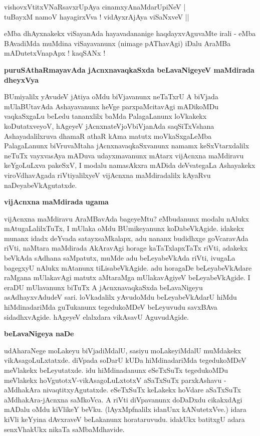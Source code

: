 \begin{shloka}
vishovxVtitxVNaRsavxrUpAya cinamxyAnaMdarUpiNeV |\\\label{65}
tuBayxM namoV hayagirxVva ! vidAyxrAjAya viSaNxveV ||
\end{shloka}

\noindent
eMba dhAyxnakekx viSayanAda hayavadananige haqdayxvAguvaMte irali - eMba BAvadiMda muMdina viSayavanunx (nimage pAThavAgi) iDalu AraMBa mADutetxVnapApx ! kaqSANx !

{\bigskip
\noindent
{\large\bf puruSAthaRmayavAda jAcnxnavaqkaSxda beLavaNigeyeV maMdirada dheyxVya}}\label{page65}
\medskip

\noindent
BUmiyalilx yAvudeV jAtiya oMdu biVjavanunx neTaTxrU A biVjada mUlaBUtavAda Ashayavanunx heVge parxpaMcitavAgi mADikoMDu vaqkaSxgaLu beLedu tananxlilx baMda PalagaLanunx loVkakekx koDutatxveyoV, hAgeyeV jAcnxnateVjoVbiVjanAda saqSiTxVshana Ashayadalilxruva dhamaR athaR kAma matutx moVkaSxgaLeMba PalagaLanunx biVruvaMtaha jAcnxnavaqkaSxvanunx namamx keSxVtarxdalilx neTuTx vayxvasAya mADuva udayxmavanunx mAtarx vijAcnxna maMdiravu keYgoLuLxva pakeSxV, I modalu namasAkxra \hbox{mADida} deVvategaLa Ashayakekx viroVdhavAgada riVtiyalilxyeV vijAcnxna maMdiradalilx \hbox{kAyaRvu} naDeyabeVkAgutatxde.

{\bigskip
\noindent
{\large\bf vijAcnxna maMdirada ugama}}
\medskip

\noindent
vijAcnxna maMdiravu AraMBavAda bageyeMtu? eMbudanunx modalu nAlukx mAtugaLalilxTuTx, I mUlaka oMdu BUmikeyanunx koDabeVkAgide. idakekx munanx idadx deYvada satayxsaMkalapx, adu nananx budidhxge goVcaravAda riVti, naMtara maMdirada AkAravAgi horage kaTaTxlapxTaTx riVti, adakekx beVkAda sAdhana saMpatutx, muMde adu beLeyabeVkAda riVti, ivugaLa bagegxyU nAlukx mAtanunx tiLisabeVkAgide. adu horagaDe beLeyabeVkAdare raMgana mUlakavAgi matutx aMtaraMga mUlakavAgiyeV beLeyabeVkAgide. I eraDU mUlavanunx biTuTx A jAcnxnavaqkaSxda beLavaNigeyu asAdhayxvAdudeV sari. loVkadalilx yAvudoMdu beLeyabeVkAdarU hiMdu hiMdinadariMda guTukanunx tegedukoMDeV beLeyuvudu savxBAva sidadhxvAgide. hAgeyeV elalxdara vikAsavU AguvudAgide.

{\bigskip
\noindent
{\large\bf beLavaNigeya naDe}}\label{page66}
\medskip

\noindent
udAharaNege moLakeyu biVjadiMdalU, sasiyu moLakeyiMdalU muMdakekx vikAsagoLuLxtatxde. diVpada soDarU kUDa hiMdinadariMda tegedukoMDeV meVlakekx beLeyutatxde. idu hiMdinadanunx eSeTxSuTx tegedukoMDu meVlakekx hoVgutotxV-vikAsagoLuLxtotxV aSaTxSuTx parxkAshavu - aMdhakAra nivaqtitxyAgutatxde. eSeTxSuTx keLakekx hoVdare aSaTxSuTx aMdhakAra-jAcnxna saMkoVca. A riVti diVpavanunx doDaDxdu cikakxdAgi mADalu oMdu kiVlikeY beVku. (lAyxMpfnalilx idanUnx kANutetxVve.) idara kiVli keYyina dAvxraveV beLakanunx horataruvudu. idakUkx batitxgU adara senxVhakUkx nikaTa saMbaMdhavide.

